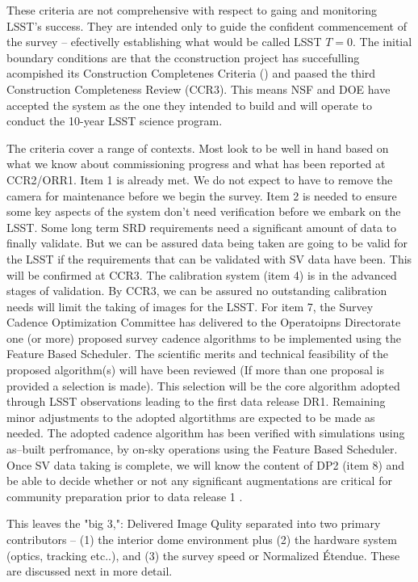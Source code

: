 These criteria are not comprehensive with respect to gaing and monitoring LSST's success. They are intended only to guide the confident commencement of the survey -- efectivelly establishing what would be called LSST $T=0$. The initial boundary conditions are that the cconstruction project has succefulling acompished its Construction Completenes Criteria (\cite{SITCOMTN-005}) and paased the third Construction Completeness Review (CCR3). This means NSF and DOE have accepted the system as the one they intended to build and will operate to conduct the 10-year LSST science program.

The criteria cover a range of contexts. Most look to be well in hand based on what we know about commissioning progress and what has been reported at CCR2/ORR1. Item 1 is already met. We do not expect to have to remove the camera for maintenance before we begin the survey. Item 2 is needed to ensure some key aspects of the system don't need verification before we embark on the LSST. Some long term SRD requirements need a significant amount of data to finally validate. But we can be assured data being taken are going to be valid for the LSST if the requirements that can be validated with SV data have been. This will be confirmed at CCR3. The calibration system (item 4)  is in the advanced stages of validation. By CCR3, we can be assured no outstanding calibration needs will limit the taking of images for the LSST. For item 7, the Survey Cadence Optimization Committee has delivered to the Operatoipns Directorate one (or more) proposed survey cadence algorithms to be implemented using the Feature Based Scheduler.  The scientific merits and technical feasibility of the proposed algorithm(s) will have been reviewed (If more than one proposal is provided a selection is made).  This selection will be the core algorithm adopted through LSST observations leading to the first data release DR1.  Remaining minor adjustments to the adopted algortithms are expected to be made as needed.  The adopted cadence algorithm has been verified with simulations using as--built perfromance, by on-sky operations using the Feature Based Scheduler.  Once SV data taking is complete, we will know the content of DP2 (item 8) and be able to decide whether or not any significant augmentations are critical for community preparation prior to data release 1 \citep[DR1; see][]{RTN-011}. 

This leaves the "big 3,": Delivered Image Qulity separated into two primary contributors -- (1) the interior dome environment plus (2) the hardware system (optics, tracking etc..), and (3) the survey speed or Normalized \'{E}tendue. These are discussed next in more detail.

